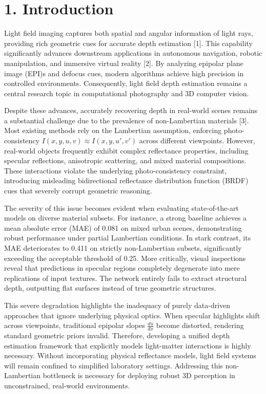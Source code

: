 \section{1. Introduction}

Light field imaging captures both spatial and angular information of light rays, providing rich geometric cues for accurate depth estimation [1]. This capability significantly advances downstream applications in autonomous navigation, robotic manipulation, and immersive virtual reality [2]. By analyzing epipolar plane image (EPI)s and defocus cues, modern algorithms achieve high precision in controlled environments. Consequently, light field depth estimation remains a central research topic in computational photography and 3D computer vision.

Despite these advances, accurately recovering depth in real-world scenes remains a substantial challenge due to the prevalence of non-Lambertian materials [3]. Most existing methods rely on the Lambertian assumption, enforcing photo-consistency $I(x, y, u, v) \approx I(x, y, u', v')$ across different viewpoints. However, real-world objects frequently exhibit complex reflectance properties, including specular reflections, anisotropic scattering, and mixed material compositions. These interactions violate the underlying photo-consistency constraint, introducing misleading bidirectional reflectance distribution function (BRDF) cues that severely corrupt geometric reasoning.

The severity of this issue becomes evident when evaluating state-of-the-art models on diverse material subsets. For instance, a strong baseline achieves a mean absolute error (MAE) of 0.081 on mixed urban scenes, demonstrating robust performance under partial Lambertian conditions. In stark contrast, its MAE deteriorates to 0.411 on strictly non-Lambertian subsets, significantly exceeding the acceptable threshold of 0.25. More critically, visual inspections reveal that predictions in specular regions completely degenerate into mere replications of input textures. The network entirely fails to extract structural depth, outputting flat surfaces instead of true geometric structures.

This severe degradation highlights the inadequacy of purely data-driven approaches that ignore underlying physical optics. When specular highlights shift across viewpoints, traditional epipolar slopes $\frac{du}{dx}$ become distorted, rendering standard geometric priors invalid. Therefore, developing a unified depth estimation framework that explicitly models light-matter interactions is highly necessary. Without incorporating physical reflectance models, light field systems will remain confined to simplified laboratory settings. Addressing this non-Lambertian bottleneck is necessary for deploying robust 3D perception in unconstrained, real-world environments.

